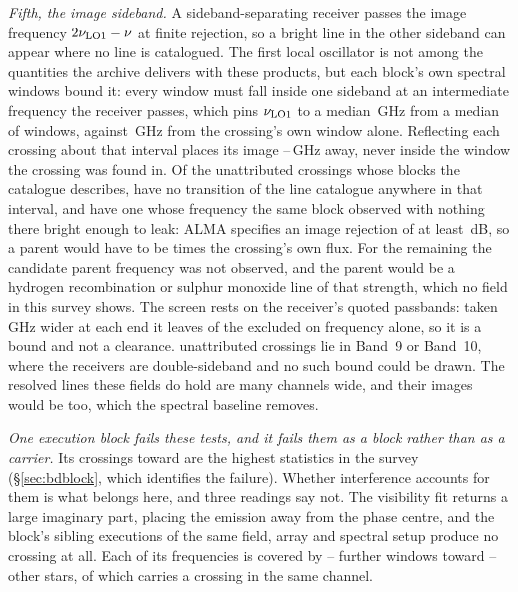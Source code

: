 \emph{Fifth, the image sideband.} A sideband-separating receiver passes the
image frequency $2\nu_{\rm LO1}-\nu$ at finite rejection, so a bright line
in the other sideband can appear where no line is catalogued. The first
local oscillator is not among the quantities the archive delivers with these
products, but each block's own spectral windows bound it: every window must
fall inside one sideband at an intermediate frequency the receiver passes,
which pins $\nu_{\rm LO1}$ to a median \ImLoWidthBlkGHz\,GHz from a median
of \ImNWinUsed{} windows, against \ImLoWidthOwnGHz\,GHz from the crossing's
own window alone. Reflecting each crossing about that interval places its
image \ImGapLoGHz--\ImGapHiGHz\,GHz away, never inside the window the
crossing was found in. Of the \ImNScreen{} unattributed crossings whose
blocks the catalogue describes, \ImNNoParent{} have no transition of the
line catalogue anywhere in that interval, and \ImNParentAbsent{} have one
whose frequency the same block observed with nothing there bright enough to
leak: ALMA specifies an image rejection of at least \ImIrrDb\,dB, so a
parent would have to be \ImIrrFac{} times the crossing's own flux. For the
remaining \ImNLeft{} the candidate parent frequency was not observed, and
the parent would be a hydrogen recombination or sulphur monoxide line of
that strength, which no field in this survey shows. The screen rests on the
receiver's quoted passbands: taken \ImWideGHz\,GHz wider at each end it
leaves \ImNNoParentWide{} of the \ImNScreen{} excluded on frequency alone,
so it is a bound and not a clearance. \ImNDsb{} unattributed crossings lie
in Band~9 or Band~10, where the receivers are double-sideband and no such
bound could be drawn. The resolved lines these fields do hold are many channels
wide, and their images would be too, which the spectral baseline removes.

\emph{One execution block fails these tests, and it fails them as a block
rather than as a carrier.} Its \DqBlockNCross{} crossings toward
\LgVerRejectStar{} are the \DqBlockNCross{} highest statistics in the survey
(\S\ref{sec:bdblock}, which identifies the failure). Whether interference
accounts for them is what belongs here, and three readings say not. The
visibility fit returns a large imaginary part,
placing the emission away from the phase centre, and the block's
\BdNSibling{} sibling executions of the same field, array and spectral setup
produce no crossing at all. Each of its frequencies is covered by
\DqOtherWinLo--\DqOtherWinHi{} further windows toward
\DqOtherStarLo--\DqOtherStarHi{} other stars, of which \DqOtherSame{} carries
a crossing in the same channel.

